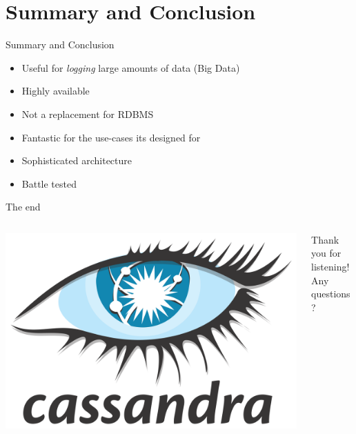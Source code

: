 \documentclass[
  10pt
]{beamer}
\begin{document}
\section{Summary and Conclusion}

\begin{frame}{Summary and Conclusion}
  \begin{itemize}
    \item<+-> Useful for \textit{logging} large amounts of data (Big Data)
    \item<+-> Highly available
    \item<+-> Not a replacement for RDBMS
    \item<+-> Fantastic for the use-cases its designed for
    \item<+-> Sophisticated architecture
    \item<+-> Battle tested
  \end{itemize}
\end{frame}

\begin{frame}{The end}
  \begin{columns}
    \begin{column}{0.5\textwidth}
      \includegraphics[width=\columnwidth]{resources/cassandra_logo.png}
    \end{column}
    \begin{column}{0.5\textwidth}
      Thank you for listening! \\
      Any questions?
    \end{column}
  \end{columns}
\end{frame}
\end{document}
